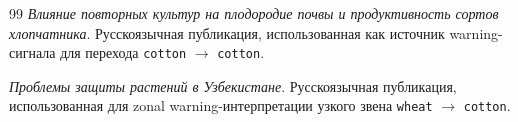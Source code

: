 \begin{thebibliography}{99}
\emph{Влияние повторных культур на плодородие почвы и продуктивность сортов хлопчатника}. Русскоязычная публикация, использованная как источник warning-сигнала для перехода \texttt{cotton} $\rightarrow$ \texttt{cotton}.

\emph{Проблемы защиты растений в Узбекистане}. Русскоязычная публикация, использованная для zonal warning-интерпретации узкого звена \texttt{wheat} $\rightarrow$ \texttt{cotton}.

\end{thebibliography}
